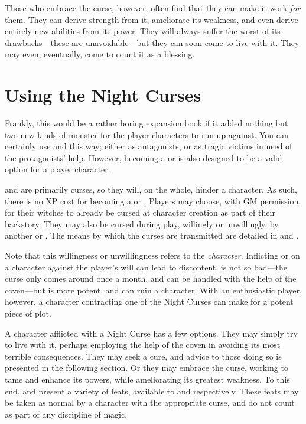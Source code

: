 Those who embrace the curse, however, often find that they can make it work \emph{for} them.
They can derive strength from it, ameliorate its weakness, and even derive entirely new abilities from its power.
They will always suffer the worst of its drawbacks---these are unavoidable---but they can soon come to live with it.
They may even, eventually, come to count it as a blessing.

\section{Using the Night Curses}

Frankly, this would be a rather boring expansion book if it added nothing but two new kinds of monster for the player characters to run up against.
You can certainly use {\vampires} and {\werewolves} this way; either as antagonists, or as tragic victims in need of the protagonists' help.
However, becoming a {\vampire} or {\werewolf} is also designed to be a valid option for a player character.

\capital{\lycanthropy} and {\vampirism} are primarily curses, so they will, on the whole, hinder a character.
As such, there is no XP cost for becoming a {\werewolf} or {\vampire}.
Players may choose, with GM permission, for their witches to already be cursed at character creation as part of their backstory.
They may also be cursed during play, willingly or unwillingly, by another {\vampire} or {\werewolf}.
The means by which the curses are transmitted are detailed in  and .

Note that this willingness or unwillingness refers to the \emph{character}.
Inflicting {\lycanthropy} or {\vampirism} on a character against the player's will can lead to discontent.
\capital{\lycanthropy} is not so bad---the curse only comes around once a month, and can be handled with the help of the coven---but {\vampirism} is more potent, and can ruin a character.
With an enthusiastic player, however, a character contracting one of the Night Curses can make for a potent piece of plot.

A character afflicted with a Night Curse has a few options.
They may simply try to live with it, perhaps employing the help of the coven in avoiding its most terrible consequences.
They may seek a cure, and advice to those doing so is presented in the following section.
Or they may embrace the curse, working to tame and enhance its powers, while ameliorating its greatest weakness.
To this end,  and  present a variety of feats, available to {\werewolves} and {\vampires} respectively.
These feats may be taken as normal by a character with the appropriate curse, and do not count as part of any discipline of magic.

